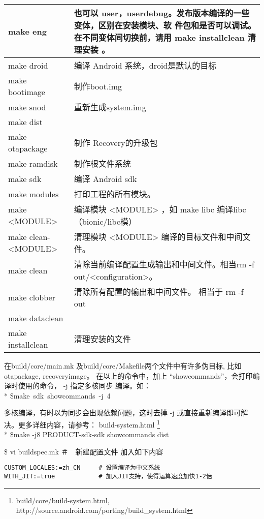 \documentclass[a4paper,titlepage]{article}
\makeatletter
\newcommand{\tabcaption}{\def\@captype{table}\caption}
\makeatother
\begin{document}
\tabcaption{Android 编译的目标和参数}
\begin{tabular}{|p{}|p{}|}\hline
make eng & 也可以 user，userdebug。发布版本编译的一些变体，区别在安装模块、软
件包和是否可以调试。在不同变体间切换前，请用 make installclean 清理安装
。\\\hline
make droid & 编译 Android 系统，droid是默认的目标 \\\hline
make bootimage & 制作boot.img\\\hline
make snod & 重新生成system.img\\\hline
make dist &\\\hline
make otapackage &  制作 Recovery的升级包\\\hline
make ramdisk & 制作根文件系统 \\\hline
make sdk & 编译 Android sdk  \\\hline
make modules & 打印工程的所有模块。\\\hline
make <MODULE> & 编译模块 <MODULE> ，如 make libc 编译libc（bionic/libc模）\\\hline
make clean-<MODULE> & 清理模块 <MODULE> 编译的目标文件和中间文件。\\\hline
make clean &清除当前编译配置生成输出和中间文件。相当rm -f out/<configuration>。\\\hline
make clobber &清除所有配置的输出和中间文件。 相当于 rm -f out\\\hline
make dataclean &\\\hline
make installclean & 清理安装的文件\\\hline

\end{tabular}
在build/core/main.mk 及build/core/Makefile两个文件中有许多伪目标, 比如otapackage, recoveryimage。
在以上的命令中，加上 “showcommands”，会打印编译时使用的命令， -j 指定多核同步
编译。如：\\*
\mbox{\$make sdk showcommands -j 4}

多核编译，有时以为同步会出现依赖问题，这时去掉 -j 或直接重新编译即可解决。更多详细内容，请参考：
build-system.html \footnote{build/core/build-system.html, http://source.android.com/porting/build_system.html}
\\*
\$make -j8 PRODUCT-sdk-sdk showcommands dist

\$ vi buildspec.mk         ＃　新建配置文件
加入如下内容
\begin{lstlisting}
CUSTOM_LOCALES:=zh_CN     # 设置编译为中文系统
WITH_JIT:=true            # 加入JIT支持，使得运算速度加快1-2倍
\end{lstlisting}
\end{document}
